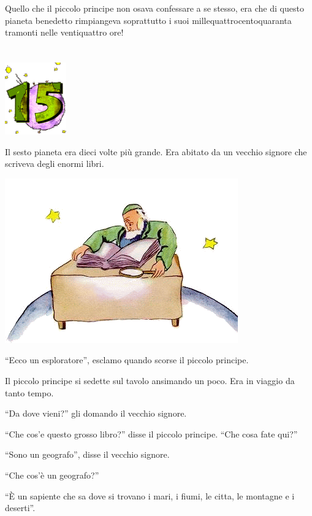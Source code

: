 \documentclass[11pt]{scrbook}
\begin{document}
Quello che il piccolo principe non osava confessare a se stesso, era che
di questo pianeta benedetto rimpiangeva soprattutto i suoi
millequattrocentoquaranta tramonti nelle ventiquattro ore!

\chapter{}
\begin{center}
\includegraphics{./img/chapter15.png}
\end{center}

Il sesto pianeta era dieci volte più grande. Era abitato da un vecchio
signore che scriveva degli enormi libri.

\begin{center}
\includegraphics{./img/15a.png}
\end{center}

``Ecco un esploratore'', esclamo quando scorse il piccolo principe.

Il piccolo principe si sedette sul tavolo ansimando un poco. Era in
viaggio da tanto tempo.

``Da dove vieni?'' gli domando il vecchio signore.

``Che cos'e questo grosso libro?'' disse il piccolo principe. ``Che cosa
fate qui?''

``Sono un geografo'', disse il vecchio signore.

``Che cos'è un geografo?''

``È un sapiente che sa dove si trovano i mari, i fiumi, le citta, le
montagne e i deserti''.
\end{document}
